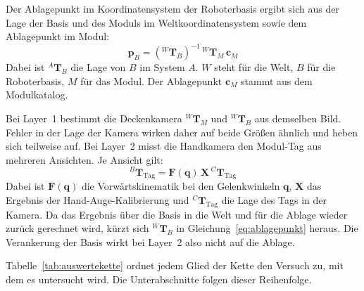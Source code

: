 
Der Ablagepunkt im Koordinatensystem der Roboterbasis ergibt sich aus der Lage der Basis und des Moduls im Weltkoordinatensystem sowie dem Ablagepunkt im Modul:
\begin{equation}
    \mathbf{p}_{B} = \left({}^{W}\mathbf{T}_{B}\right)^{-1} \, {}^{W}\mathbf{T}_{M} \, \mathbf{c}_{M}
    \label{eq:ablagepunkt}
\end{equation}
Dabei ist ${}^{A}\mathbf{T}_{B}$ die Lage von $B$ im System $A$. $W$ steht für die Welt, $B$ für die Roboterbasis, $M$ für das Modul. Der Ablagepunkt $\mathbf{c}_{M}$ stammt aus dem Modulkatalog.

Bei Layer~1 bestimmt die Deckenkamera ${}^{W}\mathbf{T}_{M}$ und ${}^{W}\mathbf{T}_{B}$ aus demselben Bild. Fehler in der Lage der Kamera wirken daher auf beide Größen ähnlich und heben sich teilweise auf. %
Bei Layer~2 misst die Handkamera den Modul-Tag aus mehreren Ansichten. Je Ansicht gilt:
\begin{equation}
    {}^{B}\mathbf{T}_{\mathrm{Tag}} = \mathbf{F}(\mathbf{q}) \, \mathbf{X} \, {}^{C}\mathbf{T}_{\mathrm{Tag}}
    \label{eq:layer2_ansicht}
\end{equation}
Dabei ist $\mathbf{F}(\mathbf{q})$ die Vorwärtskinematik bei den Gelenkwinkeln $\mathbf{q}$, $\mathbf{X}$ das Ergebnis der Hand-Auge-Kalibrierung und ${}^{C}\mathbf{T}_{\mathrm{Tag}}$ die Lage des Tags in der Kamera. Da das Ergebnis über die Basis in die Welt und für die Ablage wieder zurück gerechnet wird, kürzt sich ${}^{W}\mathbf{T}_{B}$ in Gleichung~\eqref{eq:ablagepunkt} heraus. Die Verankerung der Basis wirkt bei Layer~2 also nicht auf die Ablage.

Tabelle~\ref{tab:auswertekette} ordnet jedem Glied der Kette den Versuch zu, mit dem es untersucht wird. Die Unterabschnitte folgen dieser Reihenfolge.


